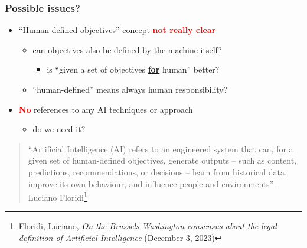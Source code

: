 \documentclass{beamer}
\begin{document}
\begin{frame}
\frametitle{Possible issues?}
\vspace{1.5em}
\begin{itemize}
\item “Human-defined objectives” concept \textcolor{red}{\textbf{not really clear}}
    \bigskip
    \begin{itemize}
    \item can objectives also be defined by the machine itself?
    \begin{itemize}
        \item is “given a set of objectives \underline{\textbf{for}} human” better?
    \end{itemize}
    \bigskip
    \item “human-defined” means always human responsibility?
    \end{itemize}
    \bigskip
\item \textcolor{red}{\textbf{No}} references to any AI techniques or approach
    \begin{itemize}
        \item do we need it?
    \end{itemize}
    
\end{itemize}

\vspace{0.9em} %
\tiny
\begin{block}{}
\begin{quote}
    “Artificial Intelligence (AI) refers to an engineered system that can, for a given set of human-defined objectives, generate outputs – such as content, predictions, recommendations, or decisions – learn from historical data, improve its own behaviour, and influence people and environments”
    - Luciano Floridi\footnote[frame]{Floridi, Luciano, \emph{On the Brussels-Washington consensus about the legal definition of Artificial Intelligence} (December 3, 2023)}
\end{quote}\end{block}
\end{frame}


\end{document}
